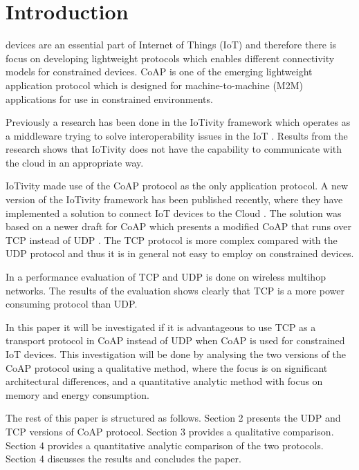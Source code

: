 \section{Introduction}
% 
% 
 devices are an essential part of Internet of Things (IoT) and therefore there is focus on developing lightweight protocols which enables different connectivity models for constrained devices.  
CoAP is one of the emerging lightweight application protocol which is designed for machine-to-machine (M2M) applications for use in constrained environments.   

Previously a research has been done in the IoTivity framework which operates as a middleware trying to solve interoperability issues in the IoT \cite{interoperabilityChallenge}. Results from the research shows that IoTivity does not have the capability to communicate with the cloud in an appropriate way. 

IoTivity made use of the CoAP protocol as the only application protocol. 
A new version of the IoTivity framework has been published recently, where they have implemented a solution to connect IoT devices to the Cloud \cite{iotivity1.1}. The solution was based on a newer draft for CoAP \cite{coapTCP} which presents a modified CoAP that runs over TCP instead of UDP \cite{coapUDP}.
The TCP protocol is more complex compared with the UDP protocol and thus it is in general not easy to employ on constrained devices.

In \cite{TCPvsUDP} a performance evaluation of TCP and UDP is done on wireless multihop networks. The results of the evaluation shows clearly that TCP is a more power consuming protocol than UDP. 

In this paper it will be investigated if it is advantageous to use TCP as a transport protocol in CoAP instead of UDP when CoAP is used for constrained IoT devices. This investigation will be done by analysing the two versions of the CoAP protocol using a qualitative method, where the focus is on significant architectural differences, and a quantitative analytic method with focus on memory and energy consumption. 

The rest of this paper is structured as follows.  Section 2 presents the UDP and TCP versions of CoAP protocol. Section 3 provides a qualitative comparison. Section 4 provides a quantitative analytic comparison of the two protocols. Section 4 discusses the results and concludes the paper.     
